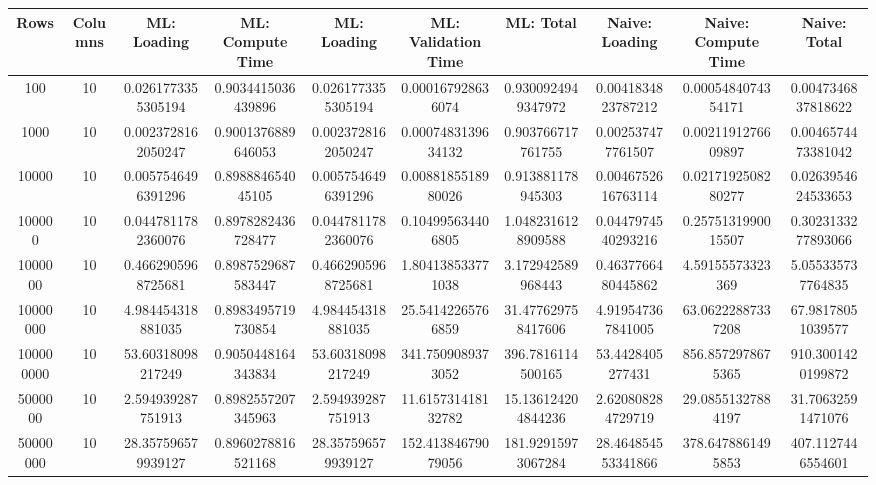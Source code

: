 \begin{table}[htb]
    \centering
    \begin{tabular}{@{}cccccccccc@{}}
        \toprule
        Rows & Columns & ML: Loading & ML: Compute Time & ML: Loading & ML: Validation Time & ML: Total & Naive: Loading & Naive: Compute Time & Naive: Total \\
        \midrule
        100 & 10 & 0.0261773355305194 & 0.9034415036439896 & 0.0261773355305194 & 0.000167928636074 & 0.9300924949347972 & 0.0041834823787212 & 0.0005484074354171 & 0.0047346837818622 \\
        1000 & 10 & 0.0023728162050247 & 0.9001376889646053 & 0.0023728162050247 & 0.0007483139634132 & 0.903766717761755 & 0.002537477761507 & 0.0021191276609897 & 0.0046574473381042 \\
        10000 & 10 & 0.0057546496391296 & 0.898884654045105 & 0.0057546496391296 & 0.0088185518980026 & 0.913881178945303 & 0.0046752616763114 & 0.0217192508280277 & 0.0263954624533653 \\
        100000 & 10 & 0.0447811782360076 & 0.8978282436728477 & 0.0447811782360076 & 0.104995634406805 & 1.0482316128909588 & 0.0447974540293216 & 0.2575131990015507 & 0.3023133277893066 \\
        1000000 & 10 & 0.4662905968725681 & 0.8987529687583447 & 0.4662905968725681 & 1.804138533771038 & 3.172942589968443 & 0.4637766480445862 & 4.59155573323369 & 5.055335737764835 \\
        10000000 & 10 & 4.984454318881035 & 0.8983495719730854 & 4.984454318881035 & 25.54142265766859 & 31.477629758417606 & 4.919547367841005 & 63.06222887337208 & 67.98178051039577 \\
        100000000 & 10 & 53.60318098217249 & 0.9050448164343834 & 53.60318098217249 & 341.7509089373052 & 396.7816114500165 & 53.4428405277431 & 856.8572978675365 & 910.3001420199872 \\
        5000000 & 10 & 2.594939287751913 & 0.8982557207345963 & 2.594939287751913 & 11.615731418132782 & 15.136124204844236 & 2.620808284729719 & 29.08551327884197 & 31.70632591471076 \\
        50000000 & 10 & 28.357596579939127 & 0.8960278816521168 & 28.357596579939127 & 152.41384679079056 & 181.92915973067284 & 28.464854553341866 & 378.6478861495853 & 407.1127446554601 \\
        \bottomrule
    \end{tabular}
\end{table}